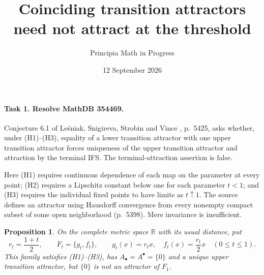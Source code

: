 \documentclass[11pt]{article}
\title{Coinciding transition attractors need not attract at the threshold}
\author{Principia Math in Progress}
\date{12 September 2026}
\newtheorem{proposition}{Proposition}
\newcommand{\R}{\mathbb R}
\newcommand{\Al}{A_{\bullet}}
\newcommand{\Au}{A^{\bullet}}
\begin{document}
\maketitle
\paragraph{Task 1. Resolve MathDB 354469.}
Conjecture 6.1 of Le\'sniak, Snigireva, Strobin and Vince
\cite{source}, p.~5425, asks whether, under (H1)--(H3), equality
of a lower transition attractor with one upper transition attractor
forces uniqueness of the upper transition attractor and attraction by
the terminal IFS. The terminal-attraction assertion is false.

Here (H1) requires continuous dependence of each map on the parameter
at every point; (H2) requires a Lipschitz constant below one for each
parameter $t<1$; and (H3) requires the individual fixed points to have
limits as $t\uparrow1$. The source defines an attractor using
Hausdorff convergence from every nonempty compact subset of some open
neighborhood (p.~5398). Mere invariance is insufficient.

\begin{proposition}
On the complete metric space $\R$ with its usual distance, put
\[
 r_t=\frac{1+t}{2},\qquad
 F_t=\{g_t,f_t\},\qquad
 g_t(x)=r_tx,\quad f_t(x)=\frac{r_t}{2}x
 \quad(0\leq t\leq1).
\]
This family satisfies (H1)--(H3), has $\Al=\Au=\{0\}$ and a unique
upper transition attractor, but $\{0\}$ is not an attractor of $F_1$.
\end{proposition}
\end{document}
